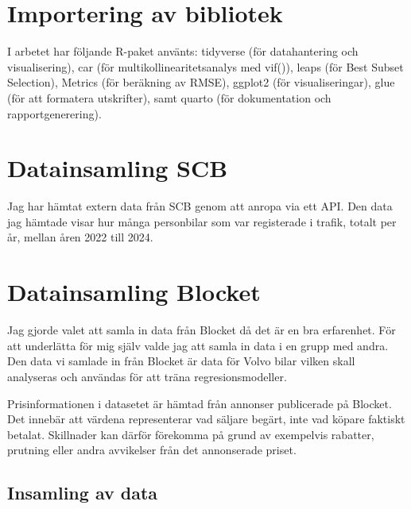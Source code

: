 \documentclass[
  letterpaper,
  DIV=11,
  numbers=noendperiod]{scrreprt}
\begin{document}
\section{Importering av bibliotek}\label{importering-av-bibliotek}

I arbetet har följande R-paket använts: tidyverse (för datahantering och
visualisering), car (för multikollinearitetsanalys med vif()), leaps
(för Best Subset Selection), Metrics (för beräkning av RMSE), ggplot2
(för visualiseringar), glue (för att formatera utskrifter), samt quarto
(för dokumentation och rapportgenerering).

\section{Datainsamling SCB}\label{datainsamling-scb}

Jag har hämtat extern data från SCB genom att anropa via ett API. Den
data jag hämtade visar hur många personbilar som var registerade i
trafik, totalt per år, mellan åren 2022 till 2024.

\section{Datainsamling Blocket}\label{datainsamling-blocket}

Jag gjorde valet att samla in data från Blocket då det är en bra
erfarenhet. För att underlätta för mig själv valde jag att samla in data
i en grupp med andra. Den data vi samlade in från Blocket är data för
Volvo bilar vilken skall analyseras och användas för att träna
regresionsmodeller.

Prisinformationen i datasetet är hämtad från annonser publicerade på
Blocket. Det innebär att värdena representerar vad säljare begärt, inte
vad köpare faktiskt betalat. Skillnader kan därför förekomma på grund av
exempelvis rabatter, prutning eller andra avvikelser från det
annonserade priset.

\subsection{Insamling av data}\label{insamling-av-data}
\end{document}
